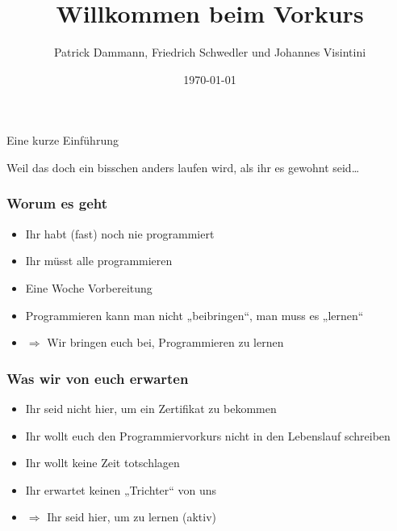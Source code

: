 \documentclass{beamer}
\newcommand{\Ra}{\Rightarrow}
\begin{document}
\title{Willkommen beim Vorkurs}
\author{Patrick Dammann, Friedrich Schwedler und Johannes Visintini}
\date{\today}

\begin{frame}
\titlepage
\end{frame}

\begin{frame}
    \begin{center}
        \Huge Eine kurze Einführung
    \end{center}
    \begin{center}
        \pause\Huge Weil das doch ein bisschen anders laufen wird, als ihr es gewohnt seid\dots
    \end{center}
\end{frame}

\begin{frame}
    \frametitle{Worum es geht}
    \begin{itemize}
        \item Ihr habt (fast) noch nie programmiert
        \pause\item Ihr müsst alle programmieren
        \pause\item Eine Woche Vorbereitung
        \pause\item Programmieren kann man nicht „beibringen“, man muss es „lernen“
        \pause\item $\Ra$ Wir bringen euch bei, Programmieren zu lernen
    \end{itemize}
\end{frame}

\begin{frame}
    \frametitle{Was wir von euch erwarten}
    \begin{itemize}
        \item Ihr seid nicht hier, um ein Zertifikat zu bekommen
        \pause\item Ihr wollt euch den Programmiervorkurs nicht in den Lebenslauf schreiben
        \pause\item Ihr wollt keine Zeit totschlagen
        \pause\item Ihr erwartet keinen „Trichter“ von uns
        \pause\item $\Ra$ Ihr seid hier, um zu lernen (aktiv)
    \end{itemize}
\end{frame}
\end{document}
